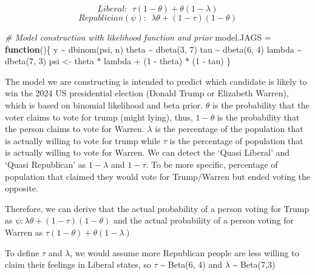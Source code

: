 \documentclass[
]{article}
\newenvironment{Shaded}{\begin{snugshade}}{\end{snugshade}}
\newcommand{\CommentTok}[1]{\textcolor[rgb]{0.56,0.35,0.01}{\textit{#1}}}
\newcommand{\ControlFlowTok}[1]{\textcolor[rgb]{0.13,0.29,0.53}{\textbf{#1}}}
\newcommand{\DecValTok}[1]{\textcolor[rgb]{0.00,0.00,0.81}{#1}}
\newcommand{\FunctionTok}[1]{\textcolor[rgb]{0.00,0.00,0.00}{#1}}
\newcommand{\NormalTok}[1]{#1}
\newcommand{\OtherTok}[1]{\textcolor[rgb]{0.56,0.35,0.01}{#1}}
\newcommand{\SpecialCharTok}[1]{\textcolor[rgb]{0.00,0.00,0.00}{#1}}
\begin{document}
\[ Liberal:\ \ \tau(1-\theta)+\theta(1-\lambda) \]
\[ Republician(\psi):\ \ \lambda\theta + (1-\tau)(1-\theta) \]

\begin{Shaded}
\begin{Highlighting}[]
\CommentTok{\# Model construction with likelihood function and prior}
\NormalTok{model.JAGS }\OtherTok{=} \ControlFlowTok{function}\NormalTok{()\{}
\NormalTok{    y }\SpecialCharTok{\textasciitilde{}} \FunctionTok{dbinom}\NormalTok{(psi, n)}
\NormalTok{    theta }\SpecialCharTok{\textasciitilde{}} \FunctionTok{dbeta}\NormalTok{(}\DecValTok{3}\NormalTok{, }\DecValTok{7}\NormalTok{)}
\NormalTok{    tau }\SpecialCharTok{\textasciitilde{}} \FunctionTok{dbeta}\NormalTok{(}\DecValTok{6}\NormalTok{, }\DecValTok{4}\NormalTok{)}
\NormalTok{    lambda }\SpecialCharTok{\textasciitilde{}} \FunctionTok{dbeta}\NormalTok{(}\DecValTok{7}\NormalTok{, }\DecValTok{3}\NormalTok{)}
\NormalTok{    psi }\OtherTok{\textless{}{-}}\NormalTok{ theta }\SpecialCharTok{*}\NormalTok{ lambda }\SpecialCharTok{+}\NormalTok{ (}\DecValTok{1} \SpecialCharTok{{-}}\NormalTok{ theta) }\SpecialCharTok{*}\NormalTok{ (}\DecValTok{1} \SpecialCharTok{{-}}\NormalTok{ tau)}
\NormalTok{  \}}
\end{Highlighting}
\end{Shaded}

The model we are constructing is intended to predict which candidate is
likely to win the 2024 US presidential election (Donald Trump or
Elizabeth Warren), which is based on binomial likelihood and beta prior.
\(\theta\) is the probability that the voter claims to vote for trump
(might lying), thus, \(1 - \theta\) is the probability that the person
claims to vote for Warren. \(\lambda\) is the percentage of the
population that is actually willing to vote for trump while \(\tau\) is
the percentage of population that is actually willing to vote for
Warren. We can detect the `Quasi Liberal' and `Quasi Republican' as
\(1-\lambda\) and \(1-\tau\). To be more specific, percentage of
population that claimed they would vote for Trump/Warren but ended
voting the opposite.

Therefore, we can derive that the actual probability of a person voting
for Trump as \(\psi:\lambda\theta + (1-\tau)(1-\theta)\) and the actual
probability of a person voting for Warren as
\(\tau(1-\theta)+\theta(1-\lambda)\)

To define \(\tau\) and \(\lambda\), we would assume more Republican
people are less willing to claim their feelings in Liberal states, so
\(\tau\) \textasciitilde{} Beta(6, 4) and \(\lambda\) \textasciitilde{}
Beta(7,3)
\end{document}
